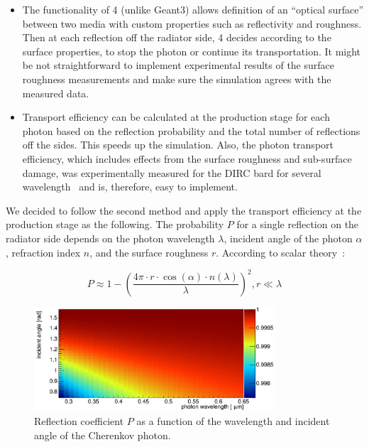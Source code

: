 \begin{itemize}
\item The functionality of {\geant}4 (unlike Geant3) allows definition of an ``optical surface'' between two media with custom properties such as reflectivity and roughness. Then at each reflection off the radiator side, {\geant}4 decides according to the surface properties, to stop the photon or continue its transportation. It might be not straightforward to implement experimental results of the surface roughness measurements and make sure the simulation agrees with the measured data.
\item Transport efficiency can be calculated at the production stage for each photon based on the reflection probability and the total number of reflections off the sides. This speeds up the simulation. Also, the photon transport efficiency, which includes effects from the surface roughness and sub-surface damage, was experimentally measured for the \babar DIRC bard for several wavelength~\cite{roughness} and is, therefore, easy to implement.
\end{itemize}

We decided to follow the second method and apply the transport efficiency at the production stage as the following. The probability $P$ for a single reflection on the radiator side depends on the photon wavelength $\lambda$, incident angle of the photon $\alpha$, refraction index $n$, and the surface roughness $r$. According to scalar theory~\cite{scalar}:

\begin{equation}
P \approx  1 - \left( \frac{4\pi \cdot r \cdot \cos(\alpha) \cdot n(\lambda)}{\lambda} \right)^{2}, r \ll \lambda
\end{equation}

\begin{figure}[!h]
\centering
\includegraphics[width=0.8\textwidth]{pics/psurf.png}
\caption{\label{pic:sur}
Reflection coefficient $P$ as a function of the wavelength and incident angle of the Cherenkov photon.
}
\end{figure}

